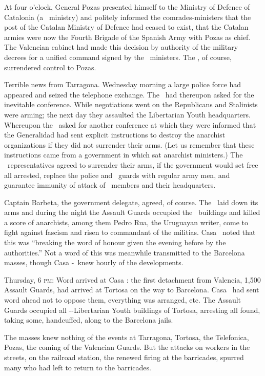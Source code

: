 At four o’clock, General Pozas presented himself to the Ministry of Defence of Catalonia (a \CNT\ ministry) and politely informed the comrades-ministers that the post of the Catalan Ministry of Defence had ceased to exist, that the Catalan armies were now the Fourth Brigade of the Spanish Army with Pozas as chief. The Valencian cabinet had made this decision by authority of the military decrees for a unified command signed by the \CNT\ ministers. The \CNT, of course, surrendered control to Pozas.

Terrible news from Tarragona. Wednesday morning a large police force had appeared and seized the telephone exchange. The \CNT\ had thereupon asked for the inevitable conference. While negotiations went on the Republicans and Stalinists were arming; the next day they assaulted the Libertarian Youth headquarters. Whereupon the \CNT\ asked for another conference at which they were informed that the Generalidad had sent explicit instructions to destroy the anarchist organizations if they did not surrender their arms. (Let us remember that these instructions came from a government in which sat anarchist ministers.) The \CNT\ representatives agreed to surrender their arms, if the government would set free all arrested, replace the police and \PSUC\ guards with regular army men, and guarantee immunity of attack of \CNT\ members and their headquarters.

Captain Barbeta, the government delegate, agreed, of course. The \CNT\ laid down its arms and during the night the Assault Guards occupied the \CNT\ buildings and killed a score of anarchists, among them Pedro Rua, the Uruguayan writer, come to fight against fascism and risen to commandant of the militias. Casa \CNT\ noted that this was ``breaking the word of honour given the evening before by the authorities.'' Not a word of this was meanwhile transmitted to the Barcelona masses, though Casa \CNT-\FAI\ knew hourly of the developments.

Thursday, 6 \textsc{pm}: Word arrived at Casa \CNT: the first detachment from Valencia, 1,500 Assault Guards, had arrived at Tortosa on the way to Barcelona. Casa \CNT\ had sent word ahead not to oppose them, everything was arranged, etc. The Assault Guards occupied all \CNT-\FAI-Libertarian Youth buildings of Tortosa, arresting all found, taking some, handcuffed, along to the Barcelona jails.

The masses knew nothing of the events at Tarragona, Tortosa, the Telefonica, Pozas, the coming of the Valencian Guards. But the attacks on workers in the streets, on the railroad station, the renewed firing at the barricades, spurred many who had left to return to the barricades.

